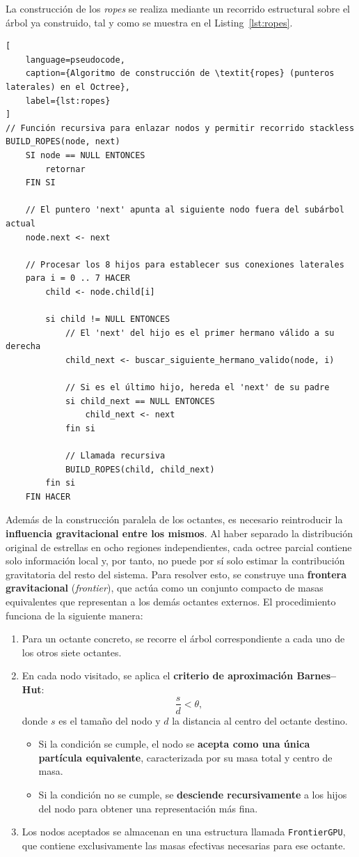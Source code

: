 La construcción de los \textit{ropes} se realiza mediante un recorrido estructural sobre el árbol ya construido, tal y como se muestra en el Listing~\ref{lst:ropes}.
\begin{lstlisting}[
    language=pseudocode,
    caption={Algoritmo de construcción de \textit{ropes} (punteros laterales) en el Octree},
    label={lst:ropes}
]
// Función recursiva para enlazar nodos y permitir recorrido stackless
BUILD_ROPES(node, next)
    SI node == NULL ENTONCES
        retornar
    FIN SI

    // El puntero 'next' apunta al siguiente nodo fuera del subárbol actual
    node.next <- next

    // Procesar los 8 hijos para establecer sus conexiones laterales
    para i = 0 .. 7 HACER
        child <- node.child[i]

        si child != NULL ENTONCES
            // El 'next' del hijo es el primer hermano válido a su derecha
            child_next <- buscar_siguiente_hermano_valido(node, i)

            // Si es el último hijo, hereda el 'next' de su padre
            si child_next == NULL ENTONCES
                child_next <- next
            fin si

            // Llamada recursiva
            BUILD_ROPES(child, child_next)
        fin si
    FIN HACER
\end{lstlisting}
Además de la construcción paralela de los octantes, es necesario reintroducir la \textbf{influencia gravitacional entre los mismos}.
Al haber separado la distribución original de estrellas en ocho regiones independientes, cada octree parcial contiene solo información local y, por tanto, no puede por sí solo estimar la contribución gravitatoria del resto del sistema. Para resolver esto, se construye una \textbf{frontera gravitacional} (\textit{frontier}), que actúa como un conjunto compacto de masas equivalentes que representan a los demás octantes externos.
El procedimiento funciona de la siguiente manera:
\begin{enumerate}
    \item Para un octante concreto, se recorre el árbol correspondiente a cada uno de los otros siete octantes.
    \item En cada nodo visitado, se aplica el \textbf{criterio de aproximación Barnes--Hut}:
    \[
        \frac{s}{d} < \theta,
    \]
    donde $s$ es el tamaño del nodo y $d$ la distancia al centro del octante destino.
    \begin{itemize}
        \item Si la condición se cumple, el nodo se \textbf{acepta como una única partícula equivalente}, caracterizada por su masa total y centro de masa.
        \item Si la condición no se cumple, se \textbf{desciende recursivamente} a los hijos del nodo para obtener una representación más fina.
    \end{itemize}
    \item Los nodos aceptados se almacenan en una estructura llamada \texttt{FrontierGPU}, que contiene exclusivamente las masas efectivas necesarias para ese octante.
\end{enumerate}

